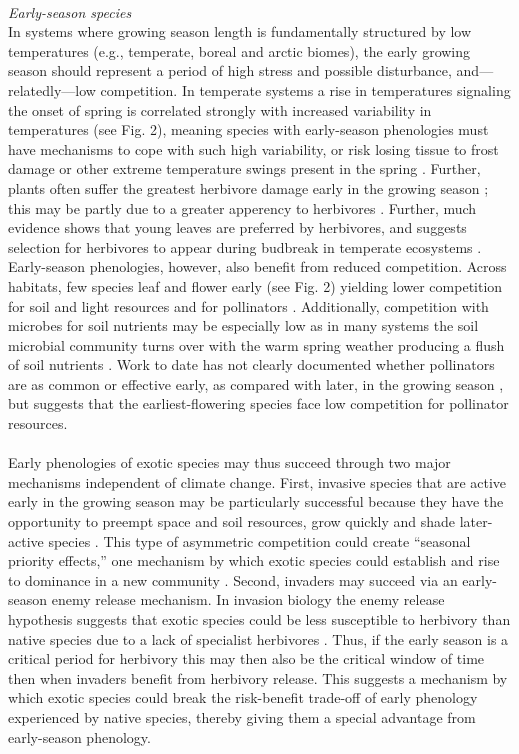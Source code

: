 \documentclass[11pt,a4paper,oneside]{article}
\begin{document}
\\
\noindent \emph{Early-season species}\\
In systems where growing season length is fundamentally structured by low temperatures (e.g., temperate, boreal and arctic biomes), the early growing season should represent a period of high stress and possible disturbance, and---relatedly---low competition. In temperate systems a rise in temperatures signaling the onset of spring is correlated strongly with increased variability in temperatures (see Fig. 2), meaning species with early-season phenologies must have mechanisms to cope with such high variability, or risk losing tissue to frost damage or other extreme temperature swings present in the spring \citep{Linkosalo2000,Augspurger:2009gj}. Further, plants often suffer the greatest herbivore damage early in the growing season \citep{Lechowicz:1984cr}; this may be partly due to a greater apperency to herbivores \citep{Brody:1997ro}. Further, much evidence shows that young leaves are preferred by herbivores, and suggests selection for herbivores to appear during budbreak in temperate ecosystems \citep{vanasch2007}. Early-season phenologies, however, also benefit from reduced competition. Across habitats, few species leaf and flower early (see Fig. 2) yielding lower competition for soil and light resources and for pollinators \citep{Mosquin1971}. Additionally, competition with microbes for soil nutrients may be especially low as in many systems the soil microbial community turns over with the warm spring weather producing a flush of soil nutrients \citep{Zak:1990ar}. Work to date has not clearly documented whether pollinators are as common or effective early, as compared with later, in the growing season \citep{Mosquin1971,filella2013}, but \citet{Mosquin1971} suggests that the earliest-flowering species face low competition for pollinator resources.\\
\\
Early phenologies of exotic species may thus succeed through two major mechanisms independent of climate change. First, invasive species that are active early in the growing season may be particularly successful because they have the opportunity to preempt space and soil resources, grow quickly and shade later-active species \citep{Weiner1990,Wilsey:2011cr,wolkovich:2010fee}. This type of asymmetric competition could create ``seasonal priority effects,'' one mechanism by which exotic species could establish and rise to dominance in a new community \citep{Wainwright:2012tw}. Second, invaders may succeed via an early-season enemy release mechanism. In invasion biology the enemy release hypothesis suggests that exotic species could be less susceptible to herbivory than native species due to a lack of specialist herbivores \citep{Keane:2002uz,Liu:2006kj}. Thus, if the early season is a critical period for herbivory this may then also be the critical window of time then when invaders benefit from herbivory release. This suggests a mechanism by which exotic species could break the risk-benefit trade-off of early phenology experienced by native species, thereby giving them a special advantage from early-season phenology.\\
\end{document}
